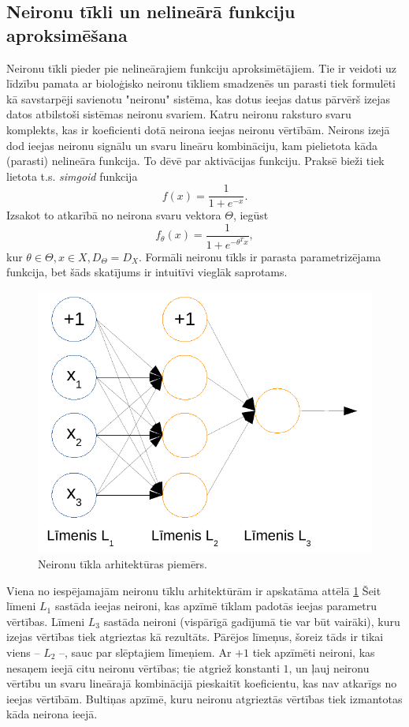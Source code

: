 \documentclass{ludis} %
\begin{document}
\subsection{Neironu tīkli un nelineārā funkciju aproksimēšana}
Neironu tīkli pieder pie nelineārajiem funkciju aproksimētājiem. Tie ir veidoti
uz līdzību pamata ar bioloģisko neironu tīkliem smadzenēs un parasti tiek
formulēti kā savstarpēji savienotu "neironu" sistēma, kas dotus ieejas datus
pārvērš izejas datos atbilstoši sistēmas neironu svariem. Katru neironu raksturo
svaru komplekts, kas ir koeficienti dotā neirona ieejas neironu vērtībām.
Neirons izejā dod ieejas neironu signālu un svaru lineāru kombināciju, kam
pielietota kāda (parasti) nelineāra funkcija. To dēvē par aktivācijas funkciju.
Praksē bieži tiek lietota t.s. \textit{simgoid} funkcija
\[
	f(x) = \frac{1}{1 + e^{-x}}.
\]
Izsakot to atkarībā no neirona svaru vektora $\Theta$, iegūst
\[
	f_\theta(x) = \frac{1}{1 + e^{-\theta^T x}},
\]
kur $\theta \in \Theta, x \in X, D_\Theta = D_X$. Formāli neironu tīkls ir
parasta parametrizējama funkcija, bet šāds skatījums ir intuitīvi vieglāk
saprotams.

\begin{figure}
	\centering
	\includegraphics{Img/nn-arhitektura.pdf}
	\caption{Neironu tīkla arhitektūras piemērs.}
	\label{fig:nn}
\end{figure}

Viena no iespējamajām neironu tīklu arhitektūrām ir apskatāma attēlā
\ref{fig:nn} Šeit līmeni $L_1$ sastāda ieejas neironi, kas apzīmē tīklam padotās
ieejas parametru vērtības. Līmeni $L_3$ sastāda neironi (vispārīgā gadījumā tie
var būt vairāki), kuru izejas vērtības tiek atgrieztas kā rezultāts. Pārējos
līmeņus, šoreiz tāds ir tikai viens -- $L_2$ --, sauc par slēptajiem līmeņiem.
Ar $+1$ tiek apzīmēti neironi, kas nesaņem ieejā citu neironu vērtības; tie
atgriež konstanti $1$, un ļauj neironu vērtību un svaru lineārajā kombinācijā
pieskaitīt koeficientu, kas nav atkarīgs no ieejas vērtībām. Bultiņas apzīmē,
kuru neironu atgrieztās vērtības tiek izmantotas kāda neirona ieejā.
\end{document}

